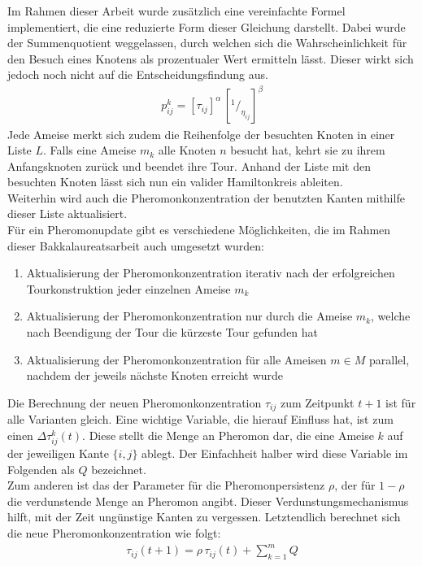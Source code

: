 \documentclass[doktyp=barbeit, sprache=german]{TUBAFarbeiten}
\newcommand*\rfrac[2]{{}^{#1}\!/_{#2}}
\begin{document}
Im Rahmen dieser Arbeit wurde zusätzlich eine vereinfachte Formel implementiert, die eine reduzierte Form dieser Gleichung darstellt. Dabei wurde der Summenquotient weggelassen, durch welchen sich die Wahrscheinlichkeit für den Besuch eines Knotens als prozentualer Wert ermitteln lässt. Dieser wirkt sich jedoch noch nicht auf die Entscheidungsfindung aus.
\begin{align}
\label{eq:ProbSimple}
p^k_{ij} = [\tau_{ij}]^\alpha \, [\rfrac{1}{\eta_{ij}}]^\beta
\end{align}
Jede Ameise merkt sich zudem die Reihenfolge der besuchten Knoten in einer Liste $L$. Falls eine Ameise $m_k$ alle Knoten $n$ besucht hat, kehrt sie zu ihrem Anfangsknoten zurück und beendet ihre Tour. Anhand der Liste mit den besuchten Knoten lässt sich nun ein valider Hamiltonkreis ableiten. 
\\Weiterhin wird auch die Pheromonkonzentration der benutzten Kanten mithilfe dieser Liste aktualisiert.
\\Für ein Pheromonupdate gibt es verschiedene Möglichkeiten, die im Rahmen dieser Bakkalaureatsarbeit auch umgesetzt wurden: 
\begin{enumerate}
\label{enum:Update}
\item Aktualisierung der Pheromonkonzentration iterativ nach der erfolgreichen Tourkonstruktion jeder einzelnen Ameise $m_k$
\item Aktualisierung der Pheromonkonzentration nur durch die Ameise $m_k$, welche nach Beendigung der Tour die kürzeste Tour gefunden hat
\item Aktualisierung der Pheromonkonzentration für alle Ameisen $m \in M$ parallel, nachdem der jeweils nächste Knoten erreicht wurde
\end{enumerate}
Die Berechnung der neuen Pheromonkonzentration $\tau_{ij}$ zum Zeitpunkt $t + 1$ ist für alle Varianten gleich. Eine wichtige Variable, die hierauf Einfluss hat, ist zum einen $\Delta \tau^k_{ij} (t)$. Diese stellt die Menge an Pheromon dar, die eine Ameise $k$ auf der jeweiligen Kante $\{i,j\}$ ablegt. Der Einfachheit halber wird diese Variable im Folgenden als $Q$ bezeichnet.
\\Zum anderen ist das der Parameter für die Pheromonpersistenz $\rho$, der für $1-\rho$ die verdunstende Menge an Pheromon angibt. Dieser Verdunstungsmechanismus hilft, mit der Zeit ungünstige Kanten zu \glqq vergessen\grqq. Letztendlich berechnet sich die neue Pheromonkonzentration wie folgt:
\begin{align}
\label{eq:Pheromone}
\tau_{ij}(t+1) = \rho \, \tau_{ij}(t) + \sum_{k=1}^m Q
\end{align}
\newpage
\end{document}
